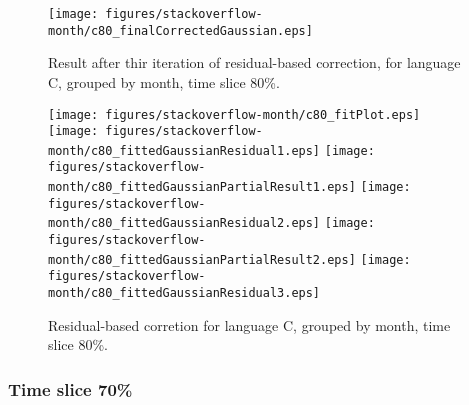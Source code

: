 \begin{figure}[]
\centering
{\texttt{[image: figures/stackoverflow-month/c80\_finalCorrectedGaussian.eps]}}
\caption{Result after thir iteration of residual-based correction, for language C, grouped by month, time slice 80\%.}
\end{figure}


\begin{figure}[hb]
\centering
{}
{\texttt{[image: figures/stackoverflow-month/c80\_fitPlot.eps]}}
{\texttt{[image: figures/stackoverflow-month/c80\_fittedGaussianResidual1.eps]}}
{\texttt{[image: figures/stackoverflow-month/c80\_fittedGaussianPartialResult1.eps]}}
{\texttt{[image: figures/stackoverflow-month/c80\_fittedGaussianResidual2.eps]}}
{\texttt{[image: figures/stackoverflow-month/c80\_fittedGaussianPartialResult2.eps]}}
{\texttt{[image: figures/stackoverflow-month/c80\_fittedGaussianResidual3.eps]}}
\caption{Residual-based corretion for language C, grouped by month, time slice 80\%.}
\end{figure}


\clearpage 
\newpage 


\FloatBarrier

\subsubsection{Time slice 70\%}

